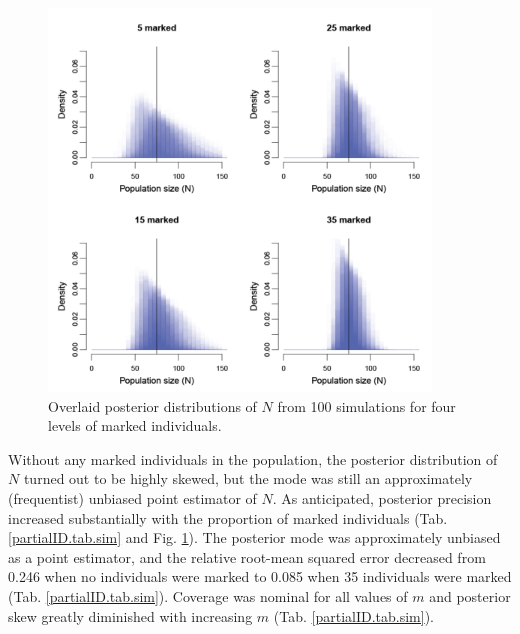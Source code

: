 \begin{figure}[ht]
  \centering
  \includegraphics[width=4in,height=4in]{Ch19-PartialID/figs/Nposts2.png}
  \caption{Overlaid posterior distributions of $N$ from 100 simulations
    for four levels of marked individuals.}
  \label{partialID.fig.nposts}
\end{figure}

Without any marked individuals in the population, the posterior
distribution of $N$ turned out to be highly skewed, but the mode was
still an approximately (frequentist) unbiased point estimator of
$N$. As anticipated, posterior precision increased substantially with
the proportion of marked individuals (Tab. \ref{partialID.tab.sim} and
Fig. \ref{partialID.fig.nposts}). The posterior mode was approximately
unbiased as a point estimator, and the relative root-mean squared
error decreased from 0.246 when no individuals were marked to 0.085
when 35 individuals were marked
(Tab. \ref{partialID.tab.sim}). Coverage was nominal for all values of
$m$ and posterior skew greatly diminished with increasing $m$ (Tab. \ref{partialID.tab.sim}).

